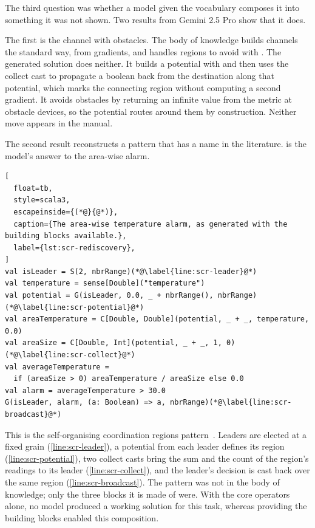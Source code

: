 The third question was whether a model given the vocabulary composes it into something it was not shown.
%
Two results from Gemini 2.5 Pro show that it does.

\begingroup
{}
The first is the channel with obstacles.
%
The body of knowledge builds channels the standard way,
from gradients,
and handles regions to avoid with .
%
The generated solution does neither.
%
It builds a potential with  and then uses the collect cast  to propagate a boolean back from the destination along that potential,
which marks the connecting region without computing a second gradient.
%
It avoids obstacles by returning an infinite value from the metric at obstacle devices,
so the potential routes around them by construction.
%
Neither move appears in the manual.
\par
\endgroup

The second result reconstructs a pattern that has a name in the literature.
%
 is the model's answer to the area-wise alarm.

\begin{lstlisting}[
  float=tb,
  style=scala3,
  escapeinside={(*@}{@*)},
  caption={The area-wise temperature alarm, as generated with the building blocks available.},
  label={lst:scr-rediscovery},
]
val isLeader = S(2, nbrRange)(*@\label{line:scr-leader}@*)
val temperature = sense[Double]("temperature")
val potential = G(isLeader, 0.0, _ + nbrRange(), nbrRange)(*@\label{line:scr-potential}@*)
val areaTemperature = C[Double, Double](potential, _ + _, temperature, 0.0)
val areaSize = C[Double, Int](potential, _ + _, 1, 0)(*@\label{line:scr-collect}@*)
val averageTemperature =
  if (areaSize > 0) areaTemperature / areaSize else 0.0
val alarm = averageTemperature > 30.0
G(isLeader, alarm, (a: Boolean) => a, nbrRange)(*@\label{line:scr-broadcast}@*)
\end{lstlisting}

This is the self-organising coordination regions pattern~\cite{DBLP:journals/fgcs/PianiniCVN21}.
%
Leaders are elected at a fixed grain (\cref{line:scr-leader}),
a potential from each leader defines its region (\cref{line:scr-potential}),
two collect casts bring the sum and the count of the region's readings to its leader (\cref{line:scr-collect}),
and the leader's decision is cast back over the same region (\cref{line:scr-broadcast}).
%
The pattern was not in the body of knowledge;
only the three blocks it is made of were.
%
With the core operators alone, no model produced a working solution for this task,
whereas providing the building blocks enabled this composition.


